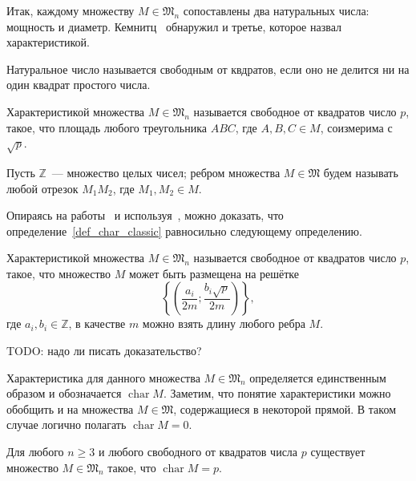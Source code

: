 Итак, каждому множеству $M\in\mathfrak{M}_n$ сопоставлены
два натуральных числа: мощность и диаметр.
Кемнитц~\cite{kemnitz1988punktmengen} обнаружил и третье,
которое назвал характеристикой.

\begin{definition}
	\cite[гл. 34, п. 3]{Bukhstab-number-theory}
	Натуральное число называется свободным от квдратов,
	если оно не делится ни на один квадрат простого числа.
\end{definition}

\begin{definition}
	\label{def_char_classic}
	Характеристикой множества $M\in\mathfrak{M}_n$ называется свободное от квадратов
	число $p$, такое, что площадь любого треугольника $ABC$, где $A,B,C\in M$,
	соизмерима с $\sqrt{p}$.
\end{definition}

Пусть $\mathbb{Z}$~--- множество целых чисел;
ребром множества $M\in\mathfrak{M}$
будем называть любой отрезок $M_1 M_2$,
где $M_1, M_2 \in M$.

Опираясь на работы~\cite{our-mkmitu-2016,our-ped-2017} и используя~\cite[теорема 3.1]{polygons-on-lattices},
можно доказать, что определение~\ref{def_char_classic} равносильно следующему определению.
\begin{definition}
	\label{def_char_classic}
	Характеристикой множества $M\in\mathfrak{M}_n$ называется свободное от квадратов
	число $p$, такое, что множество $M$ может быть размещена на решётке
\begin{equation}\label{grid_for_Erdosh_system}
	\left\{\left(
		\frac{a_i}{2m}
		;
		\frac{b_i\sqrt{p}}{2m}
	\right)\right\},
\end{equation}
где $a_i, b_i \in \mathbb{Z}$,
в качестве $m$ можно взять длину любого ребра $M$.
\end{definition}

TODO: надо ли писать доказательство?

Характеристика для данного множества $M\in\mathfrak{M}_n$ определяется единственным образом и обозначается $\operatorname{char}M$.
Заметим, что понятие характеристики можно обобщить и на множества $M\in\mathfrak{M}$,
содержащиеся в некоторой прямой.
В таком случае логично полагать $\operatorname{char} M = 0$.



\begin{theorem}
	\label{thm:power_char_exist}
	Для любого $n\geq 3$ и любого свободного от квадратов числа $p$
	существует множество $M\in\mathfrak{M}_n$ такое, что $\operatorname{char} M = p$.
\end{theorem}

